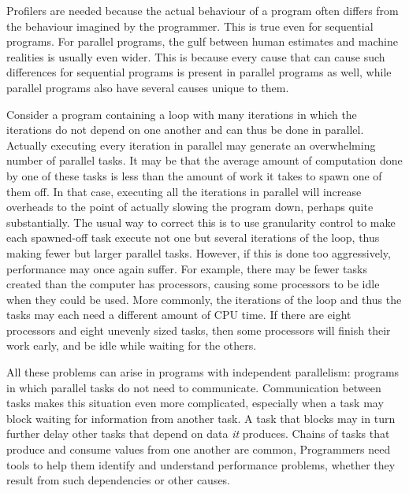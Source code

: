Profilers are needed because the actual behaviour of a program
often differs from the behaviour imagined by the programmer.
This is true even for sequential programs.
For parallel programs,
the gulf between human estimates and machine realities
is usually even wider.
This is because every cause
that can cause such differences for sequential programs
is present in parallel programs as well,
while parallel programs also have several causes unique to them.

Consider a program containing a loop with many iterations
in which the iterations do not depend on one another
and can thus be done in parallel.
Actually executing every iteration in parallel
may generate an overwhelming number of parallel tasks.
It may be that the average amount of computation done by one of these tasks
is less than the amount of work it takes to spawn one of them off.
In that case, executing all the iterations in parallel
will increase overheads to the point of actually slowing the program down,
perhaps quite substantially.
The usual way to correct this is to use granularity control
to make each spawned-off task execute
not one but several iterations of the loop,
thus making fewer but larger parallel tasks.
However, if this is done too aggressively,
performance may once again suffer.
For example,
there may be fewer tasks created than the computer has processors,
causing some processors to be idle when they could be used.
More commonly, the iterations of the loop and thus the tasks
may each need a different amount of CPU time.
If there are eight processors and eight unevenly sized tasks,
then some processors will finish their work early,
and be idle while waiting for the others.

All these problems can arise in programs with independent parallelism:
programs in which parallel tasks do not need to communicate.
Communication between tasks makes this situation even more complicated,
especially when a task may block waiting for information from another task.
A task that blocks may in turn further delay
other tasks that depend on data \emph{it} produces.
Chains of tasks that produce and consume values from one another are common,
Programmers need tools to help them
identify and understand performance problems,
whether they result from such dependencies or other causes.

